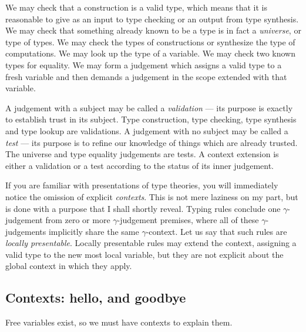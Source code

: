 \documentclass{jfp1}
\begin{document}
We may check that a construction is a valid type, which means that it
is reasonable to give as an input to type checking or an output from
type synthesis. We may check that something already known to be a type is in fact
a \emph{universe}, or type of types. We may check the types of constructions or synthesize
the type of computations. We may look up the type of a variable. We may check two known types
for equality. We may form a judgement which assigns a valid type to a fresh variable and
then demands a judgement in the scope extended with that variable.

A judgement with a subject may be called a \emph{validation} --- its
purpose is exactly to establish trust in its subject. Type construction, type checking, type synthesis and type lookup are validations. A judgement with no subject may be called a
\emph{test} --- its purpose is to refine our knowledge of things which are already trusted.
The universe and type equality judgements are tests. A context extension is either a validation
or a test according to the status of its inner judgement.

If you are familiar with presentations of type theories, you will immediately notice the
omission of explicit \emph{contexts}. This is not mere laziness on my part, but is done
with a purpose that I shall shortly reveal. Typing rules conclude one $\gamma$-judgement
from zero or more $\gamma$-judgement premises, where all of these $\gamma$-judgements
implicitly share the same $\gamma$-context. Let us say that such rules are \emph{locally presentable}.
Locally presentable rules may extend the context, assigning a valid type to the new most local
variable, but they are not explicit about the global context in which they apply.


\subsection{Contexts: hello, and goodbye}

Free variables exist, so we must have contexts to explain them.
\end{document}
